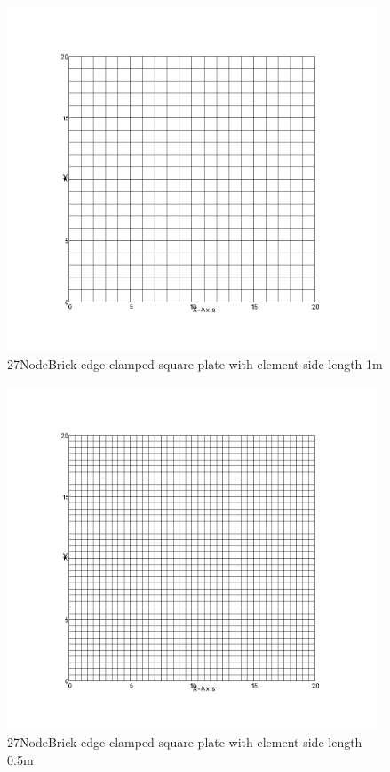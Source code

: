 \documentclass[fleqn,11pt,letter]{article}
\begin{document}
\newpage

\begin{figure}[H]
  \centering
  \includegraphics[width=11cm]{../Figure_files/27NodeBrick/square_plate4.png}
  \caption{27NodeBrick edge clamped square plate with element side length 1m }
  \label{fig 27NodeBrick edges clamped square plate with element side length 1m }
\end{figure}


\begin{figure}[H]
  \centering
  \includegraphics[width=11cm]{../Figure_files/27NodeBrick/square_plate5.png}
  \caption{27NodeBrick edge clamped square plate with element side length 0.5m }
  \label{fig 27NodeBrick edges clamped square plate with element side length 0.5m }
\end{figure}
\end{document}
